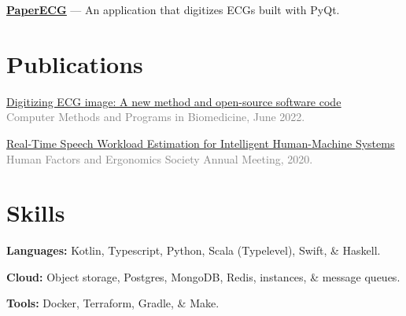 \documentclass[10pt]{article} %
\let\defaultref\href
\renewcommand{\href}[2]{%
  \defaultref{#1}{\ul{#2}}%
}
\renewcommand{\emph}[1]{%
  \textcolor{gray}{#1}%
}
\begin{document}
\begin{paracol}{2}
\textbf{\href{https://github.com/Tereshchenkolab/paper-ecg}{PaperECG}}
--- An application that digitizes ECGs built with PyQt.

\hypertarget{publications}{%
\section{Publications}\label{publications}}

\vspace{1pt}

\href{https://doi.org/10.1101/2021.07.13.21260461}{Digitizing ECG image:
A new method and open-source software code}\\
\emph{Computer Methods and Programs in Biomedicine, June 2022.}

\href{https://doi.org/10.1177/1071181320641076}{Real-Time Speech
Workload Estimation for Intelligent Human-Machine Systems}\\
\emph{Human Factors and Ergonomics Society Annual Meeting, 2020.}

\hypertarget{skills}{%
\section{Skills}\label{skills}}

\textbf{Languages:} Kotlin, Typescript, Python, Scala (Typelevel),
Swift, \& Haskell.

\textbf{Cloud:} Object storage, Postgres, MongoDB, Redis, instances, \&
message queues.

\textbf{Tools:} Docker, Terraform, Gradle, \& Make.

\end{paracol}

\end{document}
